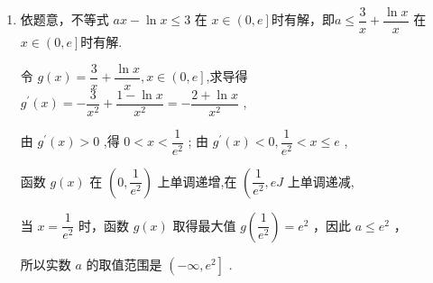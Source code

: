 \begin{enumerate}
\begin{enumerate}
\begin{jieda}
\begin{enumerate}
                当 $\dfrac{1}{2} < a < 1$ 时,由 ${f}^{\prime }\left( x\right)  < 0$ ,得 $1 \leq  x < \dfrac{1}{a}$ ; 由 ${f}^{\prime }\left( x\right)  > 0$ ,得 $\dfrac{1}{a} < x \leq  2$ ,
                
                因此函数 $f\left( x\right)$ 在 $\left\lbrack  {1,\dfrac{1}{a}}\right)$ 上单调递减，在 $\left( {\dfrac{1}{a},2}\right\rbrack$ 上单调递增，
                
                所以当 $a \leq  \dfrac{1}{2}$ 时，函数 $f\left( x\right)$ 在 $\left\lbrack  {1,2}\right\rbrack$ 上单调递减；
                
                当 $\dfrac{1}{2} < a < 1$ 时，函数 $f\left( x\right)$ 在 $\left\lbrack  {1,\dfrac{1}{a}}\right)$ 上单调递减，在 $\left( {\dfrac{1}{a},2}\right\rbrack$ 上单调递增；
                
                当 $a \geq  1$ 时，函数 $f\left( x\right)$ 在 $\left\lbrack  {1,2}\right\rbrack$ 上单调递增.

                \item 依题意，不等式 ${ax} - \ln x \leq  3$ 在 $x \in  \left(0,e\right]$时有解，即$a \leq  \dfrac{3}{x} + \dfrac{\ln x}{x}$ 在 $x \in  \left(0,e\right]$时有解.
                
                令 $g\left( x\right)  = \dfrac{3}{x} + \dfrac{\ln x}{x},x \in  \left( 0,e\right\rbrack$,求导得${g}^{\prime }\left( x\right)  =  - \dfrac{3}{{x}^{2}} + \dfrac{1 - \ln x}{{x}^{2}} =  - \dfrac{2 + \ln x}{{x}^{2}}$ ,
                
                由 ${g}^{\prime }\left( x\right)  > 0$ ,得 $0 < x < \dfrac{1}{{{e}}^{2}}$ ; 由 ${g}^{\prime }\left( x\right)  < 0,\dfrac{1}{{{e}}^{2}} < x \leq  {e}$ ,
                
                函数 $g\left( x\right)$ 在 $\left( {0,\dfrac{1}{{{e}}^{2}}}\right)$ 上单调递增,在 $\left( {\dfrac{1}{{{e}}^{2}},}\right. {e}J$ 上单调递减,
                
                当 $x = \dfrac{1}{{{e}}^{2}}$ 时，函数 $g\left( x\right)$ 取得最大值 $g\left( \dfrac{1}{{{e}}^{2}}\right)  = {{e}}^{2}$ ，因此 $a \leq  {{e}}^{2}$ ，
                
                所以实数 $a$ 的取值范围是 $\left( {-\infty ,{{e}}^{2}}\right\rbrack$ .
            \end{enumerate}
        \end{jieda}

    \end{enumerate}
    

\end{enumerate}

